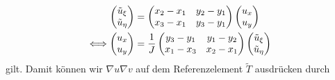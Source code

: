 \begin{align*}
	\begin{pmatrix} \tilde u_\xi \\ \tilde u_\eta \end{pmatrix} & = \begin{pmatrix}
				x_2-x_1 & y_2-y_1 \\
				x_3-x_1 & y_3-y_1
			\end{pmatrix}   \begin{pmatrix}  u_x \\  u_y \end{pmatrix} \\
	\Longleftrightarrow  \begin{pmatrix}  u_x \\  u_y \end{pmatrix} & =\frac 1J \begin{pmatrix}
				y_3-y_1 & y_1-y_2 \\
				x_1-x_3 & x_2-x_1
			\end{pmatrix} \begin{pmatrix} \tilde u_\xi \\ \tilde u_\eta \end{pmatrix}
\end{align*}
gilt. Damit können wir $\nabla u \nabla v$ auf dem Referenzelement $\widetilde T$ ausdrücken durch

